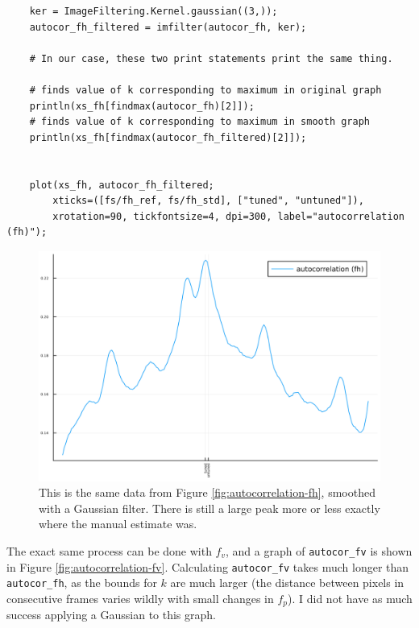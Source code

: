 \documentclass{article}
\newcommand*{\code}[1]{\texttt{#1}}
\begin{document}
\begin{verbatim}
    ker = ImageFiltering.Kernel.gaussian((3,));
    autocor_fh_filtered = imfilter(autocor_fh, ker);

    # In our case, these two print statements print the same thing.

    # finds value of k corresponding to maximum in original graph
    println(xs_fh[findmax(autocor_fh)[2]]);
    # finds value of k corresponding to maximum in smooth graph
    println(xs_fh[findmax(autocor_fh_filtered)[2]]);


    plot(xs_fh, autocor_fh_filtered;
        xticks=([fs/fh_ref, fs/fh_std], ["tuned", "untuned"]),
        xrotation=90, tickfontsize=4, dpi=300, label="autocorrelation (fh)");
\end{verbatim}

\begin{figure}
    \centering
    \includegraphics[width=\linewidth]{images/autocor_fh_smooth.png}
    \caption{This is the same data from Figure \ref{fig:autocorrelation-fh}, smoothed with a Gaussian filter. There is still a large peak more or less exactly where the manual estimate was.}
    \label{fig:autocorrelation-fh-smooth}
\end{figure}

The exact same process can be done with $f_v$, and a graph of \code{autocor_fv} is shown in Figure \ref{fig:autocorrelation-fv}. Calculating \code{autocor_fv} takes much longer than \code{autocor_fh}, as the bounds for $k$ are much larger (the distance between pixels in consecutive frames varies wildly with small changes in $f_p$). I did not have as much success applying a Gaussian to this graph.
\end{document}
